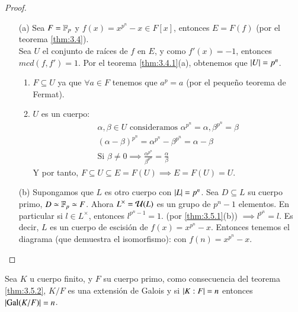 \begin{proof}$ $
    \begin{itemize}
        \item[(a)] Sea $F = \mathbb{F}_p$ y $f(x) = x^{p^n} - x \in F[x]$, entonces $E = F(f)$ (por el teorema \ref{thm:3.4}).\\
        Sea $U$ el conjunto de raíces de $f$ en $E$, y como $f'(x) = -1$, entonces $mcd(f, f') = 1$. Por el teorema \ref{thm:3.4.1}(a), obtenemos que $\left|U\right| = p^n$.\\

        \begin{enumerate}
            \item $F \subseteq U$ ya que $\forall a \in F$ tenemos que $a^p = a$ (por el pequeño teorema de Fermat).
            \item $U$ es un cuerpo:
            \begin{align*}
                \alpha, \beta \in U \text{ consideramos } \alpha^{p^n} = \alpha, \beta^{p^n} = \beta \\
                (\alpha-\beta)^{p^n} = \alpha^{p^n} - \beta^{p^n} = \alpha - \beta \\
                \text{Si } \beta \neq 0 \implies \frac{\alpha^{p^n}}{\beta^{p^n}} = \frac{\alpha}{\beta}
            \end{align*}
            Y por tanto, $F \subseteq U \subseteq E = F(U) \implies E = F(U) = U$.
        \end{enumerate}
        \item[(b)] Supongamos que $L$ es otro cuerpo con $\left|L\right| = p^n$. Sea $D \subseteq L$ su cuerpo primo, $D \simeq \mathbb{F}_p \simeq F$. Ahora $L^\times = \mathcal{U}(L)$ es un grupo de $p^n - 1$ elementos. En particular si $l \in L^\times$, entonces $l^{p^n-1} = 1$. (por \ref{thm:3.5.1}(b)) $\implies l^{p^n} = l$. Es decir, $L$ es un cuerpo de escisión de $f(x) = x^{p^n} - x$. Entonces tenemos el diagrama (que demuestra el isomorfismo):
        con $f(n) = x^{p^n} -  x$.
    \end{itemize}
\end{proof}

\begin{obs}
    Sea $K$ u cuerpo finito, y $F$ su cuerpo primo, como consecuencia del teorema \ref{thm:3.5.2}, $K/F$ es una extensión de Galois y si $\left|K:F\right| = n$ entonces $\left|\mathrm{Gal}(K/F)\right| = n$.
\end{obs}
